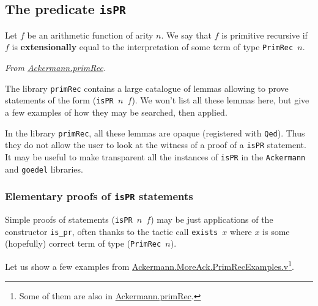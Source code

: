 \subsection{The predicate \texttt{isPR}}


Let $f$ be an arithmetic function of arity $n$. We say that $f$ is primitive recursive if $f$ is \textbf{extensionally}
equal to the interpretation of some term of type \texttt{PrimRec $n$}. 

\vspace{4pt}
\noindent
\emph{From \href{../theories/html/hydras.Ackermann.primRec.html}{Ackermann.primRec}.}



The library \texttt{primRec} contains a large catalogue of lemmas allowing to prove statements 
of the form (\texttt{isPR $n$ $f$}). We won't list all these lemmas here, but give a few examples of
how they may be searched, then applied.

\begin{remark}
In the library \texttt{primRec}, all these lemmas are opaque (registered with \texttt{Qed}). Thus they do not allow the user to look at the witness of a proof of a \texttt{isPR} statement. 
It may be useful to make transparent all the instances of
\texttt{isPR} in the \texttt{Ackermann} and \texttt{goedel} libraries.
\end{remark}

\subsubsection{Elementary proofs of \texttt{isPR} statements}

Simple proofs of statements (\texttt{isPR $n$ $f$}) may be just 
applications of the constructor \texttt{is\_pr}, often
thanks to the tactic call \texttt{exists $x$} where $x$ 
is some (hopefully) correct term of type (\texttt{PrimRec $n$}).

Let us show a few examples from
\href{../theories/html/hydras.MoreAck.PrimRecExamples.html}%
{Ackermann.MoreAck.PrimRecExamples.v}\footnote{Some of them are also in \href{../theories/html/hydras.Ackermann.primRec.html}{Ackermann.primRec}.}.








